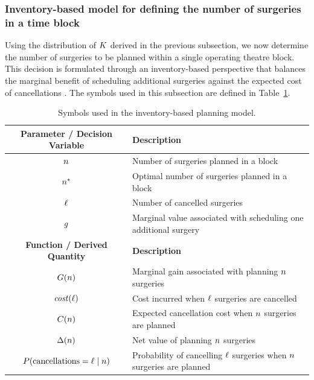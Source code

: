 \subsubsection{Inventory-based model for defining the number of surgeries in a time block\label{sec:patientsperblock}}

Using the distribution of $K$ derived in the previous subsection, we now determine the number of surgeries to be planned within a single operating theatre block. 
This decision is formulated through an inventory-based perspective that balances the marginal benefit of scheduling additional surgeries against the expected cost of cancellations \citep[e.g.,][]{Axsater2015Inv}.
The symbols used in this subsection are defined in Table~\ref{tab:symb_inventory}.

\begin{table}[htb]
    \centering
    \caption{Symbols used in the inventory-based planning model.\label{tab:symb_inventory}}
    \scriptsize
    \begin{tabular}{cl}
    \toprule
    \textbf{Parameter / Decision Variable} & \textbf{Description} \\
    \midrule
    $n$ & Number of surgeries planned in a block \\
    $n^*$ & Optimal number of surgeries planned in a block \\
    $\ell$ & Number of cancelled surgeries \\
    $g$ & Marginal value associated with scheduling one additional surgery \\
    \midrule

    \textbf{Function / Derived Quantity} & \textbf{Description} \\
    \midrule
    $G(n)$ & Marginal gain associated with planning $n$ surgeries \\
    $\mathit{cost}(\ell)$ & Cost incurred when $\ell$ surgeries are cancelled \\
    $C(n)$ & Expected cancellation cost when $n$ surgeries are planned \\
    $\Delta(n)$ & Net value of planning $n$ surgeries \\
    $P(\text{cancellations}=\ell \mid n)$ & Probability of cancelling $\ell$ surgeries when $n$ surgeries are planned \\
    \bottomrule
    \end{tabular}
\end{table}


